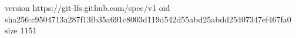 version https://git-lfs.github.com/spec/v1
oid sha256:c9504713a287f13fb35a691c8003d119d542d55abd25abdd25407347ef467fa0
size 1151
